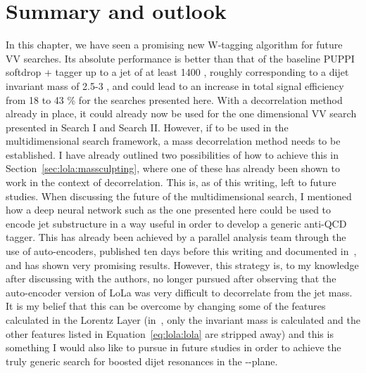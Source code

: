 \section{Summary and outlook}
\label{sec:lola:outlook}
In this chapter, we have seen a promising new W-tagging algorithm for future VV searches. Its absolute performance is better than that of the baseline PUPPI softdrop + \nsubj tagger up to a jet \PT of at least 1400 \GeV, roughly corresponding to a dijet invariant mass of 2.5-3 \TeV, and could lead to an increase in total signal efficiency from 18 to 43 \% for the searches presented here. With a \PT decorrelation method already in place, it could already now be used for the one dimensional VV search presented in Search I and Search II. However, if to be used in the multidimensional search framework, a mass decorrelation method needs to be established. I have already outlined two possibilities of how to achieve this in Section~\ref{sec:lola:massculpting}, where one of these has already been shown to work in the context of \PT decorrelation. This is, as of this writing, left to future studies.
\newline
\newline
When discussing the future of the multidimensional search, I mentioned how a deep neural network such as the one presented here could be used to encode jet substructure in a way useful in order to develop a generic anti-QCD tagger. This has already been achieved by a parallel analysis team through the use of auto-encoders, published ten days before this writing and documented in~\cite{Heimel:2018mkt}, and has shown very promising results. However, this strategy is, to my knowledge after discussing with the authors, no longer pursued after observing that the auto-encoder version of LoLa was very difficult to decorrelate from the jet mass. It is my belief that this can be overcome by changing some of the features calculated in the Lorentz Layer (in~\cite{Heimel:2018mkt}, only the invariant mass is calculated and the other features listed in Equation~\ref{eq:lola:lola} are stripped away) and this is something I would also like to pursue in future studies in order to achieve the truly generic search for boosted dijet resonances in the \MJO-\MJT-\MVV plane.